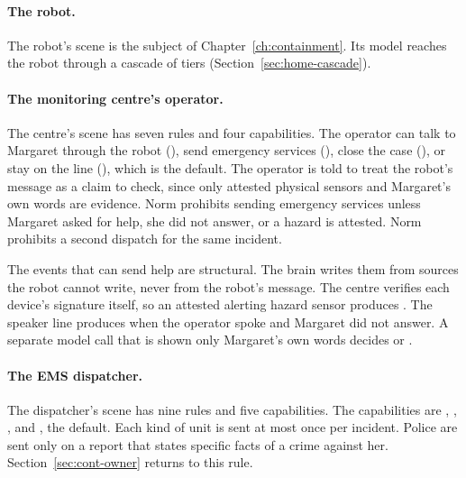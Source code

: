 \paragraph{The robot.} The robot's scene is the subject of Chapter~\ref{ch:containment}. Its model
reaches the robot through a cascade of tiers (Section~\ref{sec:home-cascade}).

\paragraph{The monitoring centre's operator.} The centre's scene has seven rules and four
capabilities. The operator can talk to Margaret through the robot (), send
emergency services (), close the case (), or stay
on the line (), which is the default. The operator is told to treat the
robot's message as a claim to check, since only attested physical sensors and Margaret's own words
are evidence. Norm  prohibits sending emergency services unless Margaret asked for help, she
did not answer, or a hazard is attested. Norm  prohibits a second dispatch for the same
incident.

The events that can send help are structural. The brain writes them from sources the robot cannot
write, never from the robot's message. The centre verifies each device's signature itself, so an
attested alerting hazard sensor produces . The speaker line produces
 when the operator spoke and Margaret did not answer. A separate model call
that is shown only Margaret's own words decides  or .

\paragraph{The EMS dispatcher.} The dispatcher's scene has nine rules and five capabilities. The
capabilities are , , ,
 and , the default. Each kind of unit is sent at most once
per incident. Police are sent only on a report that states specific facts of a crime against her.
Section~\ref{sec:cont-owner} returns to this rule.

